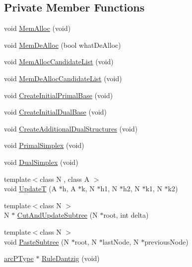 \subsection*{Private Member Functions}
\begin{DoxyCompactItemize}
\item 
void \mbox{\hyperlink{class_m_c_f_simplex_a0f5c43a76c4b5140beeaa378a659c772}{Mem\+Alloc}} (void)
\item 
void \mbox{\hyperlink{class_m_c_f_simplex_a2a005056cb70bd839ccefe601db0d98f}{Mem\+De\+Alloc}} (bool what\+De\+Alloc)
\item 
void \mbox{\hyperlink{class_m_c_f_simplex_a8121db5b0073f67ecdf7db437e16aa2a}{Mem\+Alloc\+Candidate\+List}} (void)
\item 
void \mbox{\hyperlink{class_m_c_f_simplex_a0481186b3a286006206194536049fa4e}{Mem\+De\+Alloc\+Candidate\+List}} (void)
\item 
void \mbox{\hyperlink{class_m_c_f_simplex_a2842a4c775e477701fbb9302bb83917f}{Create\+Initial\+Primal\+Base}} (void)
\item 
void \mbox{\hyperlink{class_m_c_f_simplex_ab247de21b7c3808df5b8b31731f29c28}{Create\+Initial\+Dual\+Base}} (void)
\item 
void \mbox{\hyperlink{class_m_c_f_simplex_a3307d3095386f58161d35f0b22222193}{Create\+Additional\+Dual\+Structures}} (void)
\item 
void \mbox{\hyperlink{class_m_c_f_simplex_a93cdea00618b8e60410dc46c14480016}{Primal\+Simplex}} (void)
\item 
void \mbox{\hyperlink{class_m_c_f_simplex_a0cd80ca2cfd4f7467a5d1c359b6c4d1e}{Dual\+Simplex}} (void)
\item 
{\footnotesize template$<$class N , class A $>$ }\\void \mbox{\hyperlink{class_m_c_f_simplex_aa9439b5dfb2ab2be94e1f131ad466ec3}{UpdateT}} (A $\ast$h, A $\ast$k, N $\ast$h1, N $\ast$h2, N $\ast$k1, N $\ast$k2)
\item 
{\footnotesize template$<$class N $>$ }\\N $\ast$ \mbox{\hyperlink{class_m_c_f_simplex_a45c07b1bf138391205e7b99325177723}{Cut\+And\+Update\+Subtree}} (N $\ast$root, int delta)
\item 
{\footnotesize template$<$class N $>$ }\\void \mbox{\hyperlink{class_m_c_f_simplex_af1a941ba6508775aab50d90a919ada6e}{Paste\+Subtree}} (N $\ast$root, N $\ast$last\+Node, N $\ast$previous\+Node)
\item 
\mbox{\hyperlink{struct_m_c_f_simplex_1_1arc_p_type}{arc\+P\+Type}} $\ast$ \mbox{\hyperlink{class_m_c_f_simplex_afd80a1b4c0c9efc6d596c01ba4812b66}{Rule\+Dantzig}} (void)

\end{DoxyCompactItemize}

